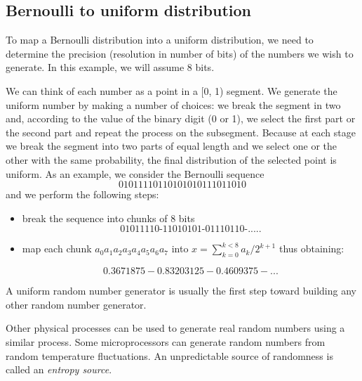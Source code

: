 \documentclass[justified, sixbynine]{tufte-book}
\theoremstyle{plain}%
\newtheorem * {corollary}{Corollary}
\theoremstyle{definition}
\theoremstyle{remark}
\newtheorem * {remark}{Remark}
\newtheorem * {note}{Note}
\begin{document}
\begin{fullwidth}
\goodbreak\subsection{Bernoulli to uniform distribution}


To map a Bernoulli distribution into a uniform distribution, we need
to determine the precision (resolution in number of bits) of the numbers we wish
to generate. In this example, we will assume 8 bits.

We can think of each number as a point in a [0, 1) segment. We generate the
uniform number by making a number of choices: we break the segment in two
and, according to the value of the binary digit (0 or 1), we select the first
part or the second part and repeat the process on the subsegment. Because
at each stage we break the segment into two parts of equal length and we
select one or the other with the same probability, the final distribution of
the selected point is uniform. As an example, we consider the Bernoulli
sequence
\begin{equation}
01011110110101010111011010
\end{equation}
and we perform the following steps:

\begin{itemize}
\item  break the sequence into chunks of 8 bits
\begin{equation}
\text{01011110-11010101-01110110-.....}
\end{equation}

\item  map each chunk $a_0a_1a_2a_3a_4a_5a_6a_7$ into $x=\sum_{k=0}^{k<8}a_k/2^{k+1}$
thus obtaining:

\begin{equation}
0.3671875 - 0.83203125 - 0.4609375 - ...
\end{equation}
\end{itemize}

A uniform random number generator is usually the first step toward building
any other random number generator.


Other physical processes can be used to generate real random numbers using a similar process.
Some microprocessors can generate random numbers from random temperature fluctuations.
An unpredictable source of randomness is called an {\it entropy source}.


\end{fullwidth}
\end{document}
